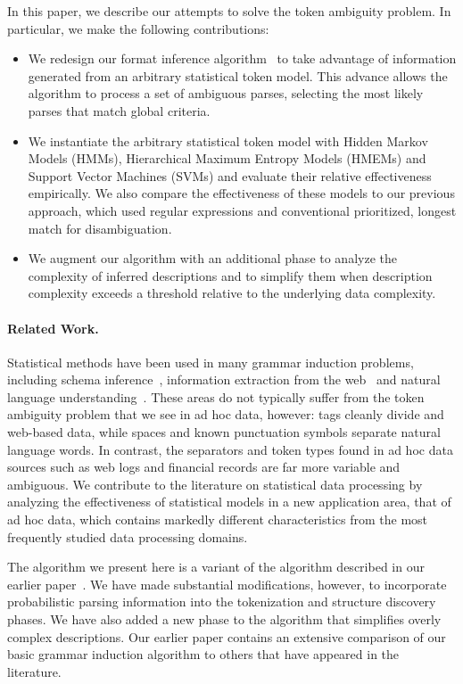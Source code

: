 In this paper, we describe our attempts to solve the token ambiguity problem.
In particular, we make the following contributions:
\begin{itemize}
\item We redesign our format inference algorithm~\cite{fisher+:dirttoshovels} 
to take advantage of information 
generated from an arbitrary statistical token model.
This advance allows the algorithm to process a set of
ambiguous parses, selecting the most likely parses that 
match global criteria.
\item We instantiate the arbitrary statistical token model with
Hidden Markov Models (HMMs), Hierarchical Maximum Entropy Models
(HMEMs) and Support Vector Machines (SVMs) and evaluate 
their relative effectiveness empirically.  We also compare the effectiveness of
these models to our previous approach, which used regular expressions
and conventional prioritized, longest match for disambiguation.
\item We augment our algorithm with an additional phase to
analyze the complexity of inferred descriptions and to simplify
them when description complexity exceeds a threshold relative to
the underlying data complexity.
\end{itemize}

\paragraph*{Related Work.}
Statistical methods have been used in many grammar induction problems,
including 
\xml{} schema inference~\cite{bex+:dtd-inference}, 
information extraction from the web~\cite{hong:thesis,arasu+:sigmod03long}  
and 
natural language understanding~\cite{Chen95bayesiangrammar}.
These areas do not typically suffer from the
token ambiguity problem that we see in ad hoc data, however:  
tags cleanly divide 
\xml{} and web-based data, while spaces and known punctuation symbols
separate natural language words.
In contrast,
the separators and token types found in ad hoc data sources such as
web logs and financial records are far more variable and 
ambiguous.  We contribute to the literature on statistical 
data processing by analyzing the effectiveness of statistical models
in a new application area, that of ad hoc data, which contains 
markedly different characteristics from the most frequently studied
data processing domains.

The algorithm we present here is a variant of the algorithm described
in our earlier paper~\cite{fisher+:dirttoshovels}.  We have made
substantial modifications, however, to incorporate probabilistic
parsing information into the tokenization and structure discovery
phases.  We have also added a new phase to the algorithm that
simplifies overly complex descriptions.  Our earlier paper contains an
extensive comparison of our basic grammar induction
algorithm to others that have appeared in the literature.

